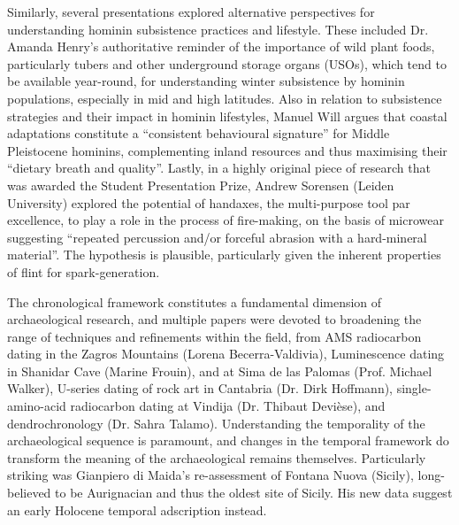 Similarly, several presentations explored alternative perspectives for understanding hominin subsistence practices and lifestyle. These included Dr. Amanda Henry’s authoritative reminder of the importance of wild plant foods, particularly tubers and other underground storage organs (USOs), which tend to be available year-round, for understanding winter subsistence by hominin populations, especially in mid and high latitudes. Also in relation to subsistence strategies and their impact in hominin lifestyles, Manuel Will argues that coastal adaptations constitute a “consistent behavioural signature” for Middle Pleistocene hominins, complementing inland resources and thus maximising their “dietary breath and quality”. Lastly, in a highly original piece of research that was awarded the Student Presentation Prize, Andrew Sorensen (Leiden University) explored the potential of handaxes, the multi-purpose tool par excellence, to play a role in the process of fire-making, on the basis of microwear suggesting “repeated percussion and/or forceful abrasion with a hard-mineral material”. The hypothesis is plausible, particularly given the inherent properties of flint for spark-generation.

The chronological framework constitutes a fundamental dimension of archaeological research, and multiple papers were devoted to broadening the range of techniques and refinements within the field, from AMS radiocarbon dating in the Zagros Mountains (Lorena Becerra-Valdivia), Luminescence dating in Shanidar Cave (Marine Frouin), and at Sima de las Palomas (Prof. Michael Walker), U-series dating of rock art in Cantabria (Dr. Dirk Hoffmann), single-amino-acid radiocarbon dating at Vindija (Dr. Thibaut Devièse), and dendrochronology (Dr. Sahra Talamo). Understanding the temporality of the archaeological sequence is paramount, and changes in the temporal framework do transform the meaning of the archaeological remains themselves. Particularly striking was Gianpiero di Maida’s re-assessment of Fontana Nuova (Sicily), long-believed to be Aurignacian and thus the oldest site of Sicily. His new data suggest an early Holocene temporal adscription instead.

